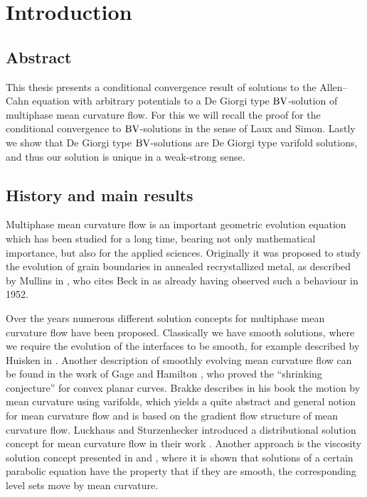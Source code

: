 \chapter{Introduction}

\section{Abstract}

This thesis presents a conditional convergence result of solutions to the 
Allen--Cahn equation with arbitrary potentials to a De Giorgi type $ \operatorname{BV} 
$-solution of multiphase mean 
curvature flow. For this we will recall the proof for the conditional 
convergence to $ \operatorname{BV} $-solutions in 
the sense of Laux and Simon. Lastly we show that De Giorgi type $ \operatorname{BV} 
$-solutions are De Giorgi type varifold solutions, and thus our solution 
is unique in a weak-strong sense.

\section{History and main results}

Multiphase mean curvature flow is an important geometric evolution equation 
which 
has been studied for a long time, bearing not only mathematical importance, but 
also for the applied sciences. Originally it was proposed to study the 
evolution of grain boundaries in annealed recrystallized metal, as described by
Mullins in \cite{mullins_two_dimensional_motion_of_idealized_grain_boundaries}, 
who cites Beck in \cite{beck_metal_interfaces} as already having observed such 
a behaviour in 1952. 

Over the years numerous different solution concepts for multiphase mean 
curvature flow have been proposed. Classically we have smooth solutions, where 
we require the evolution of the interfaces to be smooth, for example described 
by Huisken 
in \cite{huisken_asymptotic_behavior_for_singuliarities_of_mcf}. 
Another description of smoothly evolving mean curvature flow can be found in 
the work of Gage and Hamilton 
\cite{gage_hamilton_the_heat_equation_shrinking_convex_plane_curves}, who 
proved the \enquote{shrinking conjecture} for convex planar curves.
Brakke describes in his book 
\cite{brakke_kenneth_motion_of_surface_by_mean_curvature} the motion by mean 
curvature using varifolds, which yields a quite abstract and general notion for 
mean curvature flow and is based on the gradient flow structure of mean 
curvature flow. 
Luckhaus and Sturzenhecker introduced a 
distributional solution concept for mean curvature flow in their work 
\cite{luckhaus_sturzenhecker_implicit_time_discretization_for_mcf}. Another 
approach is the viscosity solution concept presented in 
\cite{chen_giga_goto_uniqueness_and_existence_of_generalized_mcf_equations} and
\cite{evans_spruck_motion_of_level_sets_by_mean_curvature}, where it is shown 
that solutions of a certain parabolic equation have the property that if they 
are smooth, the corresponding level sets move by mean curvature.

